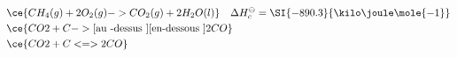 \begin{align}
  &   \ce{CH_4(g) + 2O_2(g) -> CO_2(g) + 2H_2O(l)} \quad \Delta
  H_c^{\ominus} = \SI {-890.3}{\kilo \joule \mole{-1}} \\
  &   \ce{ CO2 + C  ->[\text{au -dessus }][\text{en-dessous }] 2CO }\\
  & \ce{CO2 + C  <=> 2CO }
\end{align}
